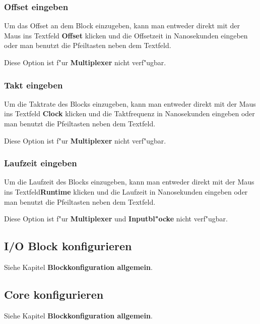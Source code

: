 \documentclass[a4paper,titlepage,12pt,ngerman]{scrbook}
\begin{document}
\subsubsection{Offset eingeben}
Um das Offset an dem Block einzugeben, kann man entweder direkt mit der Maus ins Textfeld {\bf Offset} klicken und die Offsetzeit in Nanosekunden eingeben oder man benutzt die Pfeiltasten neben dem Textfeld.\par
Diese Option ist f"ur {\bf Multiplexer} nicht verf"ugbar.
\subsubsection{Takt eingeben}
Um die Taktrate des Blocks einzugeben, kann man entweder direkt mit der Maus ins Textfeld {\bf Clock} klicken und die Taktfrequenz in Nanosekunden eingeben oder man benutzt die Pfeiltasten neben dem Textfeld.\par
Diese Option ist f"ur {\bf Multiplexer} nicht verf"ugbar.
\subsubsection{Laufzeit eingeben}
Um die Laufzeit des Blocks einzugeben, kann man entweder direkt mit der Maus ins Textfeld{\bf Runtime} klicken und die Laufzeit in Nanosekunden eingeben oder man benutzt die Pfeiltasten neben dem Textfeld.\par
Diese Option ist f"ur {\bf Multiplexer} und {\bf Inputbl"ocke} nicht verf"ugbar.


\subsection{I/O Block konfigurieren}
Siehe Kapitel {\bf Blockkonfiguration allgemein}.



\subsection{Core konfigurieren}
Siehe Kapitel {\bf Blockkonfiguration allgemein}.
\end{document}
